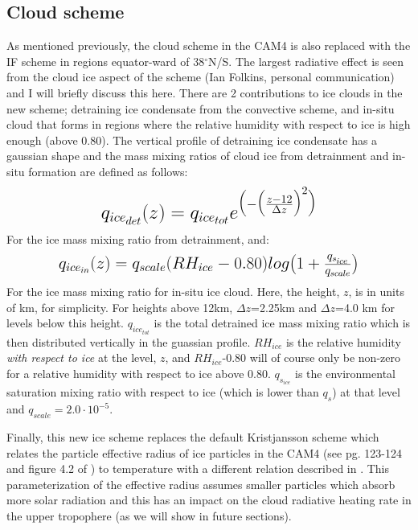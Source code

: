 \documentclass[letterpaper,12pt,titlepage,oneside,final]{book}
\begin{document}
\subsection{Cloud scheme}
As mentioned previously, the cloud scheme in the CAM4 is also replaced with the IF scheme in regions equator-ward of 38$^{\circ}$N/S. The largest radiative effect is seen from the cloud ice aspect of the scheme (Ian Folkins, personal communication) and I will briefly discuss this here. There are 2 contributions to ice clouds in the new scheme; detraining ice condensate from the convective scheme, and in-situ cloud that forms in regions where the relative humidity with respect to ice is high enough (above 0.80). The vertical profile of detraining ice condensate has a gaussian shape and the mass mixing ratios of cloud ice from detrainment and in-situ formation are defined as follows:
\begin{align}
\mbox{\fontsize{17.28}{21.6}\selectfont\(
q_{ice_{det}}(z)=q_{ice_{tot}}e^{\big(-\big(\frac{z-12}{\Delta{z}}\big)^{2}\big)}
\)}
\end{align}
For the ice mass mixing ratio from detrainment, and:
\begin{align}
\mbox{\fontsize{15}{21.6}\selectfont\(
q_{ice_{in}}(z)=q_{scale}(RH_{ice}-0.80)log\big(1+\frac{q_{s_{ice}}}{q_{scale}}\big)
\)}
\end{align}
For the ice mass mixing ratio for in-situ ice cloud. Here, the  height, $z$, is in units of km, for simplicity. For heights above 12km, $\Delta{z}$=2.25km and $\Delta{z}$=4.0 km for levels below this height. $q_{ice_{tot}}$ is the total detrained ice mass mixing ratio which is then distributed vertically in the guassian profile. $RH_{ice}$ is the relative humidity \textit{with respect to ice} at the level, $z$, and $RH_{ice}$-0.80 will of course only be non-zero for a relative humidity with respect to ice above 0.80. $q_{s_{ice}}$ is the environmental saturation mixing ratio with respect to ice (which is lower than $q_{s}$) at that level and $q_{scale}=2.0\cdot10^{-5}$. 

Finally, this new ice scheme replaces the default Kristjansson scheme which relates the particle effective radius of ice particles \citep{kristjansson_impact_2000} in the CAM4 (see pg. 123-124 and figure 4.2 of \cite{neale_description_2010}) to temperature with a different relation described in \citep{garrett_small_2003}. This parameterization of the effective radius assumes smaller particles which absorb more solar radiation and this has an impact on the cloud radiative heating rate in the upper tropophere (as we will show in future sections). 
\end{document}
